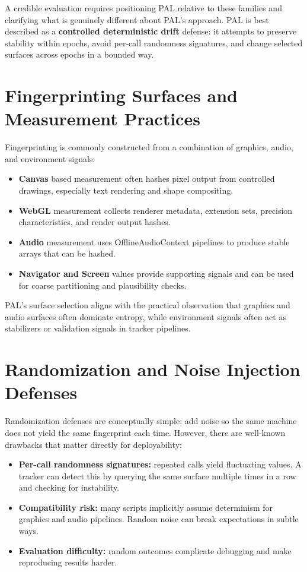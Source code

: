 \documentclass[11pt]{report}
\begin{document}
A credible evaluation requires positioning PAL relative to these families and clarifying what is genuinely different about PAL’s approach. PAL is best described as a \textbf{controlled deterministic drift} defense: it attempts to preserve stability within epochs, avoid per-call randomness signatures, and change selected surfaces across epochs in a bounded way.

\section{Fingerprinting Surfaces and Measurement Practices}

Fingerprinting is commonly constructed from a combination of graphics, audio, and environment signals:

\begin{itemize}
    \item \textbf{Canvas} based measurement often hashes pixel output from controlled drawings, especially text rendering and shape compositing.
    \item \textbf{WebGL} measurement collects renderer metadata, extension sets, precision characteristics, and render output hashes.
    \item \textbf{Audio} measurement uses OfflineAudioContext pipelines to produce stable arrays that can be hashed.
    \item \textbf{Navigator and Screen} values provide supporting signals and can be used for coarse partitioning and plausibility checks.
\end{itemize}

PAL’s surface selection aligns with the practical observation that graphics and audio surfaces often dominate entropy, while environment signals often act as stabilizers or validation signals in tracker pipelines.

\section{Randomization and Noise Injection Defenses}

Randomization defenses are conceptually simple: add noise so the same machine does not yield the same fingerprint each time. However, there are well-known drawbacks that matter directly for deployability:

\begin{itemize}
    \item \textbf{Per-call randomness signatures:} repeated calls yield fluctuating values. A tracker can detect this by querying the same surface multiple times in a row and checking for instability.
    \item \textbf{Compatibility risk:} many scripts implicitly assume determinism for graphics and audio pipelines. Random noise can break expectations in subtle ways.
    \item \textbf{Evaluation difficulty:} random outcomes complicate debugging and make reproducing results harder.
\end{itemize}
\end{document}
